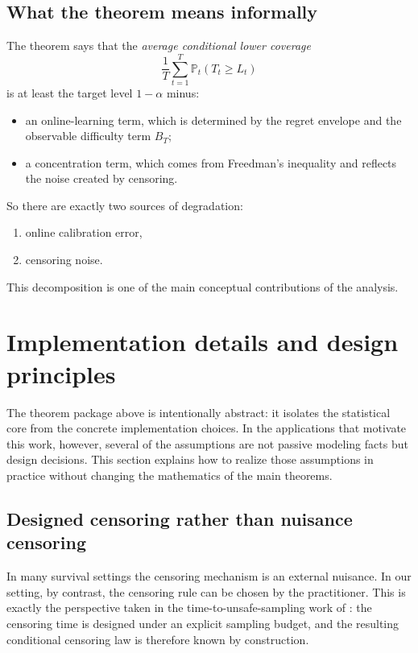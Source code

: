 \documentclass[11pt]{article}
\newcommand{\Prob}{\mathbb{P}}
\newcommand{\1}{\mathbf{1}}
\begin{document}
\subsection{What the theorem means informally}

The theorem says that the \emph{average conditional lower coverage}
\[
\frac{1}{T}\sum_{t=1}^T\Prob_t(T_t\ge L_t)
\]
is at least the target level $1-\alpha$ minus:
\begin{itemize}[leftmargin=*,itemsep=2pt]
  \item an online-learning term, which is determined by the regret envelope and the observable difficulty term $B_T$;
  \item a concentration term, which comes from Freedman's inequality and reflects the noise created by censoring.
\end{itemize}

So there are exactly two sources of degradation:
\begin{enumerate}[leftmargin=*,itemsep=2pt]
  \item online calibration error,
  \item censoring noise.
\end{enumerate}

This decomposition is one of the main conceptual contributions of the analysis.


\section{Implementation details and design principles}
\label{sec:implementation}

The theorem package above is intentionally abstract: it isolates the statistical core from the concrete implementation choices. In the applications that motivate this work, however, several of the assumptions are not passive modeling facts but design decisions. This section explains how to realize those assumptions in practice without changing the mathematics of the main theorems.

\subsection{Designed censoring rather than nuisance censoring}

In many survival settings the censoring mechanism is an external nuisance. In our setting, by contrast, the censoring rule can be chosen by the practitioner. This is exactly the perspective taken in the time-to-unsafe-sampling work of \citet{Davidov2025}: the censoring time is designed under an explicit sampling budget, and the resulting conditional censoring law is therefore known by construction.
\end{document}
